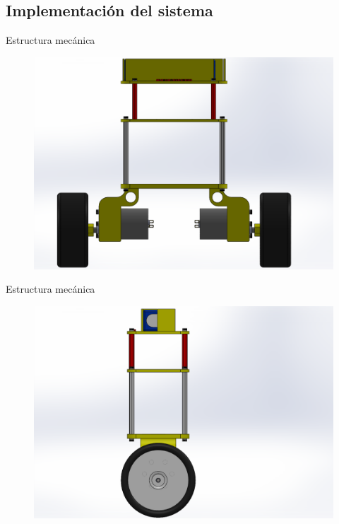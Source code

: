 \documentclass{beamer}
\begin{document}
\subsection{Implementación del sistema}

\begin{frame}{Estructura mecánica}
\begin{center}
	\begin{figure}[H]
		\center
		\includegraphics[trim = 1cm 0mm 2.7cm 0mm,clip, angle=0, scale = 0.35]{imagenes/Balancing_Robot/EnsanBalanceFront.PDF}
	\end{figure}
\end{center}
\end{frame}

\begin{frame}{Estructura mecánica}
\begin{center}
	\begin{figure}[H]
		\center
		\includegraphics[trim = 5cm 0mm 10cm 0mm,clip, angle=0, scale = 0.35]{imagenes/Balancing_Robot/EnsanBalanceLateral.PDF}
	\end{figure}
\end{center}
\end{frame}
\end{document}
